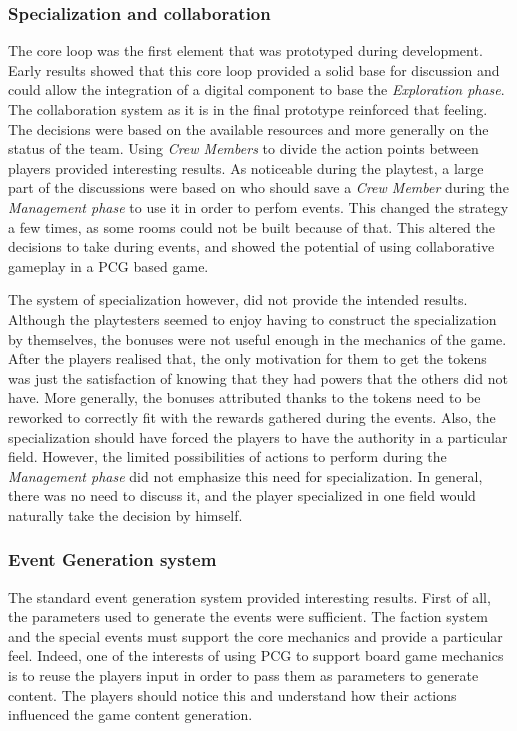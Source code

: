 \subsubsection{Specialization and collaboration}
The core loop was the first element that was prototyped during development. Early results showed that this core loop provided a solid base for discussion and could allow the integration of a digital component to base the \textit{Exploration phase}. The collaboration system as it is in the final prototype reinforced that feeling. The decisions were based on the available resources and more generally on the status of the team. Using \textit{Crew Members} to divide the action points between players provided interesting results. As noticeable during the playtest, a large part of the discussions were based on who should save a \textit{Crew Member} during the \textit{Management phase} to use it in order to perfom events. This changed the strategy a few times, as some rooms could not be built because of that. This altered the decisions to take during events, and showed the potential of using collaborative gameplay in a PCG based game.

The system of specialization however, did not provide the intended results. Although the playtesters seemed to enjoy having to construct the specialization by themselves, the bonuses were not useful enough in the mechanics of the game. After the players realised that, the only motivation for them to get the tokens was just the satisfaction of knowing that they had powers that the others did not have. More generally, the bonuses attributed thanks to the tokens need to be reworked to correctly fit with the rewards gathered during the events. Also, the specialization should have forced the players to have the authority in a particular field. However, the limited possibilities of actions to perform during the \textit{Management phase} did not emphasize this need for specialization. In general, there was no need to discuss it, and the player specialized in one field would naturally take the decision by himself.

\subsubsection{Event Generation system}
The standard event generation system provided interesting results. First of all, the parameters used to generate the events were sufficient.
The faction system and the special events must support the core mechanics and provide a particular feel. Indeed, one of the interests of using PCG to support board game mechanics is to reuse the players input in order to pass them as parameters to generate content. The players should notice this and understand how their actions influenced the game content generation. 


